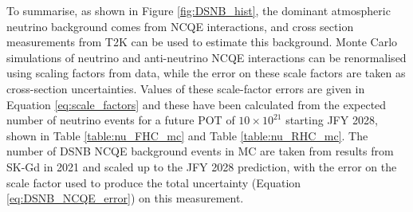 To summarise, as shown in Figure \ref{fig:DSNB_hist}, the dominant atmospheric neutrino background comes from NCQE interactions, and cross section measurements from T2K can be used to estimate this background. Monte Carlo simulations of neutrino and anti-neutrino NCQE interactions can be renormalised using scaling factors from data, while the error on these scale factors are taken as cross-section uncertainties. Values of these scale-factor errors are given in Equation \ref{eq:scale_factors} and these have been calculated from the expected number of neutrino events for a future POT of $10 \times 10^{21}$ starting JFY 2028, shown in Table \ref{table:nu_FHC_mc} and Table \ref{table:nu_RHC_mc}. The number of DSNB NCQE background events in MC are taken from results from SK-Gd in 2021 and scaled up to the JFY 2028 prediction, with the error on the scale factor used to produce the total uncertainty (Equation \ref{eq:DSNB_NCQE_error}) on this measurement. 

